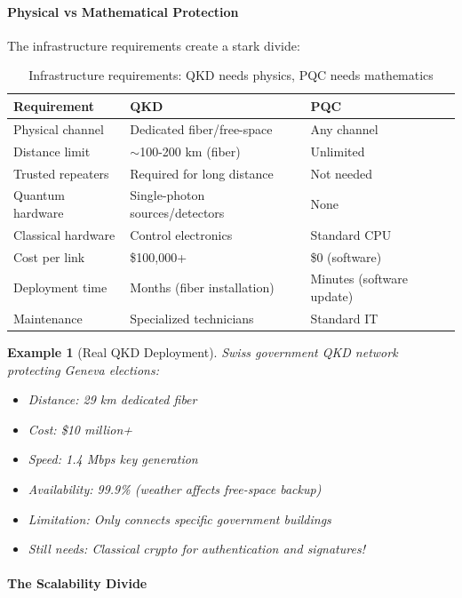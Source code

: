 \documentclass[11pt,a4paper]{article}
\newtheorem{example}{Example}
\begin{document}
\paragraph{Physical vs Mathematical Protection}

The infrastructure requirements create a stark divide:

\begin{table}[h]
\centering
\begin{tabular}{|l|l|l|}
\hline
\textbf{Requirement} & \textbf{QKD} & \textbf{PQC} \\
\hline
Physical channel & Dedicated fiber/free-space & Any channel \\
Distance limit & $\sim$100-200 km (fiber) & Unlimited \\
Trusted repeaters & Required for long distance & Not needed \\
Quantum hardware & Single-photon sources/detectors & None \\
Classical hardware & Control electronics & Standard CPU \\
Cost per link & \$100,000+ & \$0 (software) \\
Deployment time & Months (fiber installation) & Minutes (software update) \\
Maintenance & Specialized technicians & Standard IT \\
\hline
\end{tabular}
\caption{Infrastructure requirements: QKD needs physics, PQC needs mathematics}
\end{table}

\begin{example}[Real QKD Deployment]
Swiss government QKD network protecting Geneva elections:
\begin{itemize}
    \item Distance: 29 km dedicated fiber
    \item Cost: \$10 million+ 
    \item Speed: 1.4 Mbps key generation
    \item Availability: 99.9\% (weather affects free-space backup)
    \item Limitation: Only connects specific government buildings
    \item Still needs: Classical crypto for authentication and signatures!
\end{itemize}
\end{example}

\paragraph{The Scalability Divide}
\end{document}
